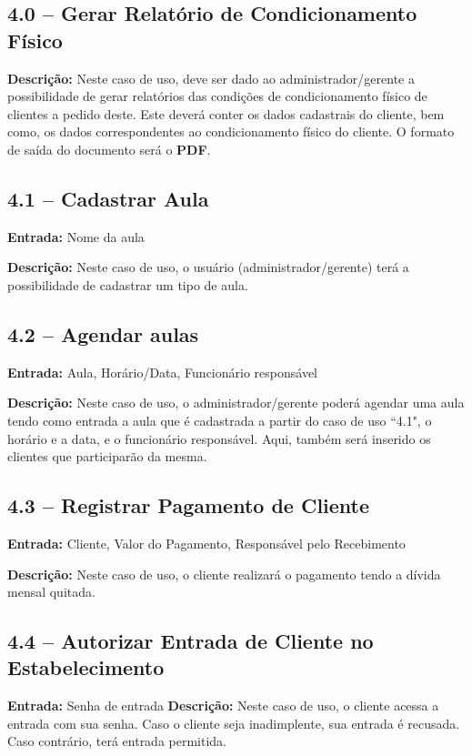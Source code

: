 \documentclass[12pt,a4paper,oneside]{report}
\begin{document}
	\subsection*{4.0 -- Gerar Relatório de Condicionamento Físico}
	\textbf{Descrição:} Neste caso de uso, deve ser dado ao administrador/gerente a possibilidade de gerar relatórios das condições de condicionamento físico de clientes a pedido deste. Este deverá conter os dados cadastrais do cliente, bem como, os dados correspondentes ao condicionamento físico do cliente. O formato de saída do documento será o \textbf{PDF}.
	
	\subsection*{4.1 -- Cadastrar Aula}
	\textbf{Entrada:} Nome da aula
	
	\textbf{Descrição:} Neste caso de uso, o usuário (administrador/gerente) terá a possibilidade de cadastrar um tipo de aula.
	
	\subsection*{4.2 -- Agendar aulas}
	\textbf{Entrada:} Aula, Horário/Data, Funcionário responsável
	
	\textbf{Descrição:} Neste caso de uso, o administrador/gerente poderá agendar uma aula tendo como entrada a aula que é cadastrada a partir do caso de uso ``4.1", o horário e a data, e o funcionário responsável. Aqui, também  será inserido os clientes que participarão da mesma.
	
	\subsection*{4.3 -- Registrar Pagamento de Cliente}
	\textbf{Entrada:} Cliente, Valor do Pagamento, Responsável pelo Recebimento
	
	\textbf{Descrição:} Neste caso de uso, o cliente realizará o pagamento tendo a dívida mensal quitada. 
	
	\subsection*{4.4 -- Autorizar Entrada de Cliente no Estabelecimento}
	\textbf{Entrada:} Senha de entrada
	\textbf{Descrição:} Neste caso de uso, o cliente acessa a entrada com sua senha. Caso o cliente seja inadimplente, sua entrada é recusada. Caso contrário, terá entrada permitida.
	
\end{document}
